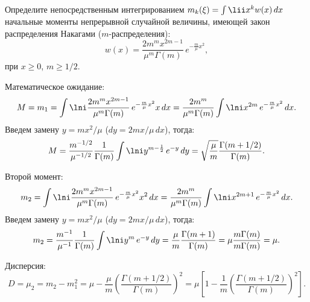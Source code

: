 \documentclass[pscyr]{hedwork}
\begin{document}
  \maketitle

  \begin{task}{6}{
    Определите непосредственным интегрированием
    \( m_k(\xi) = \int\lii x^k w(x)\,dx \) начальные моменты непрерывной
    случайной величины, имеющей закон распределения Накагами
    (\( m \)-распределения):
    \[
      w(x) = \frac{2m^m x^{2m - 1}}{\mu^m\Gamma(m)}\,e^{-\frac{m}{\mu}x^2},
    \]
    при \( x \ge 0 \), \( m \ge 1 / 2 \).
  }
  
    Математическое ожидание:
    \[
      M = m_1 = \int\lni \frac{2m^m x^{2m - 1}}{\mu^m\Gamma(m)}\,
        e^{-\frac{m}{\mu}x^2} x\,dx = \frac{2m^m}{\mu^m\Gamma(m)}
        \int\lni x^{2m}\,e^{-\frac{m}{\mu}x^2}\,dx.
    \]
    Введем замену \( y = mx^2 / \mu \) (\( dy = 2mx / \mu\,dx \)), тогда:
    \[
      M = \frac{m^{-1/2}}{\mu^{-1/2}}\frac{1}{\Gamma(m)}
        \int\lni y^{m - \frac{1}{2}}\,e^{-y}\,dy =
        \sqrt{\frac{\mu}{m}} \frac{\Gamma(m + 1/2)}{\Gamma(m)}.
    \]
    
    Второй момент:
    \[
      m_2 = \int\lni \frac{2m^m x^{2m - 1}}{\mu^m\Gamma(m)}\,
        e^{-\frac{m}{\mu}x^2} x^2\,dx = \frac{2m^m}{\mu^m\Gamma(m)}
        \int\lni x^{2m + 1}\,e^{-\frac{m}{\mu}x^2}\,dx.
    \]
    Введем замену \( y = mx^2 / \mu \) (\( dy = 2mx / \mu\,dx \)), тогда:
    \[
      m_2 = \frac{m^{-1}}{\mu^{-1}}\frac{1}{\Gamma(m)}
        \int\lni y^m\,e^{-y}\,dy =
        \frac{\mu}{m} \frac{\Gamma(m + 1)}{\Gamma(m)} =
        \mu\frac{m\Gamma(m)}{m\Gamma(m)} = \mu.
    \]
    
    Дисперсия:
    \[
      D = \mu_2 = m_2 - m_1^2 = \mu - \frac{\mu}{m}
        \left(\frac{\Gamma(m + 1/2)}{\Gamma(m)}\right)^{\!\!2} =
        \mu\left[1 - \frac{1}{m}
        \left(\frac{\Gamma(m + 1/2)}{\Gamma(m)}\right)^{\!\!2}\right].
    \]
  \end{task}
\end{document}
